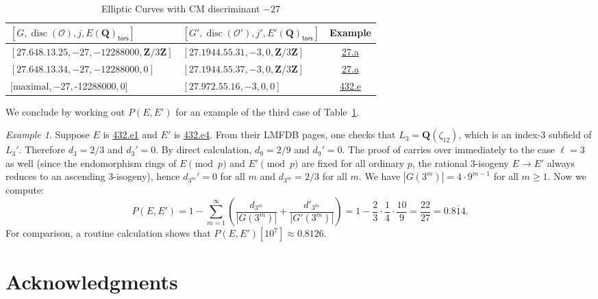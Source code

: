\documentclass{amsart}
\newcommand{\Z}{\mathbf{Z}}
\newcommand{\Q}{\mathbf{Q}}
\newcommand{\disc}{\operatorname{disc}}
\newcommand{\tors}{\mathsf{tors}}
\numberwithin{equation}{section}
\theoremstyle{plain}
\theoremstyle{remark}
\newtheorem{exm}[equation]{Example}
\begin{document}
\begin{center}
\begin{table}
\begin{tabular}{|l|l|c|}
\hline
$[G, \disc(\mathcal{O}), j,E(\Q)_\tors]$ & $[G', \disc(\mathcal{O}'), j',E'(\Q)_\tors]$ & Example\\
\hline
$[27.648.13.25,-27,-12288000, \Z/3\Z]$ & $[27.1944.55.31, -3, 0, \Z/3\Z]$ & \href{https://beta.lmfdb.org/EllipticCurve/Q/27/a/}{27.a} \\
\hline
$[27.648.13.34,-27,-12288000, 0]$ & $[27.1944.55.37, -3, 0, \Z/3\Z]$ & \href{https://beta.lmfdb.org/EllipticCurve/Q/27/a/}{27.a} \\
\hline
$[\text{maximal}, -27,$-12288000$,0]$ & $[27.972.55.16,-3,0,0]$&\href{https://beta.lmfdb.org/EllipticCurve/Q/432/e/}{432.e} \\
\hline
\end{tabular} \caption{Elliptic Curves with CM discriminant $-27$} \label{table1}
\end{table}
\end{center}

We conclude by working out $P(E,E')$ for an example of the third case of Table~\ref{table1}.  

\begin{exm}
Suppose $E$ is \href{https://beta.lmfdb.org/EllipticCurve/Q/432/e/1}{432.e1} and $E'$ is  \href{https://beta.lmfdb.org/EllipticCurve/Q/432/e/4}{432.e4}.  From their LMFDB pages, one checks that $L_3 = \Q(\zeta_{12})$, which is an index-3 subfield of $L_3'$.  Therefore $d_3 = 2/3$ and $d_3'=0$.  By direct calculation, $d_9 = 2/9$ and $d_9'=0$.  The proof of \cite[Prop. 6.1]{rnt} carries over immediately to the case $\ell=3$ as well (since the endomorphism rings of $E \pmod{p}$ and $E' \pmod{p}$ are fixed for all ordinary $p$, the rational 3-isogeny $E \to E'$ always reduces to an ascending 3-isogeny), hence $d_{3^m}' = 0$ for all $m$ and $d_{3^m} = 2/3$ for all $m$.  We have $|G(3^m)| = 4\cdot 9^{m-1}$ for all $m \geq 1$.  Now we compute:
\[
P(E,E') = 1 - \sum_{m = 1}^\infty \left( \frac{d_{3^m}}{|G(3^m)|} +  \frac{d'_{3^m}}{|G'(3^m)|} \right) = 1-\frac{2}{3} \cdot \frac{1}{4} \cdot \frac{10}{9}  = \frac{22}{27} = 0.\overline{814}.
\]
For comparison, a routine calculation shows that $P(E,E')[10^7] \approx 0.8126$.
\end{exm}

\section*{Acknowledgments}
\end{document}
